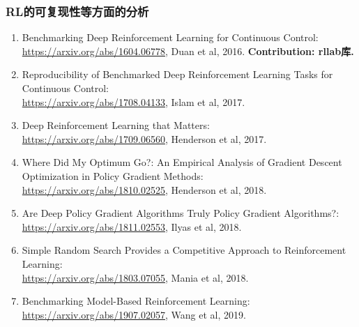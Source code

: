 \documentclass[lang=cn,11pt,a4paper]{elegant_template}
\begin{document}
\subsubsection{RL的可复现性等方面的分析} 
\begin{enumerate}
\item Benchmarking Deep Reinforcement Learning for Continuous Control:\\ \href{https://arxiv.org/abs/1604.06778}{https://arxiv.org/abs/1604.06778}, Duan et al, 2016. \textbf{Contribution: rllab库.}
\item Reproducibility of Benchmarked Deep Reinforcement Learning Tasks for Continuous Control:\\ \href{https://arxiv.org/abs/1708.04133}{https://arxiv.org/abs/1708.04133}, Islam et al, 2017.
\item Deep Reinforcement Learning that Matters:\\ \href{https://arxiv.org/abs/1709.06560}{https://arxiv.org/abs/1709.06560}, Henderson et al, 2017.
\item Where Did My Optimum Go?: An Empirical Analysis of Gradient Descent Optimization in Policy Gradient Methods:\\ \href{https://arxiv.org/abs/1810.02525}{https://arxiv.org/abs/1810.02525}, Henderson et al, 2018.
\item Are Deep Policy Gradient Algorithms Truly Policy Gradient Algorithms?:\\ \href{https://arxiv.org/abs/1811.02553}{https://arxiv.org/abs/1811.02553}, Ilyas et al, 2018.
\item Simple Random Search Provides a Competitive Approach to Reinforcement Learning:\\ \href{https://arxiv.org/abs/1803.07055}{https://arxiv.org/abs/1803.07055}, Mania et al, 2018.
\item Benchmarking Model-Based Reinforcement Learning:\\ \href{https://arxiv.org/abs/1907.02057}{https://arxiv.org/abs/1907.02057}, Wang et al, 2019.
\end{enumerate}
\end{document}
